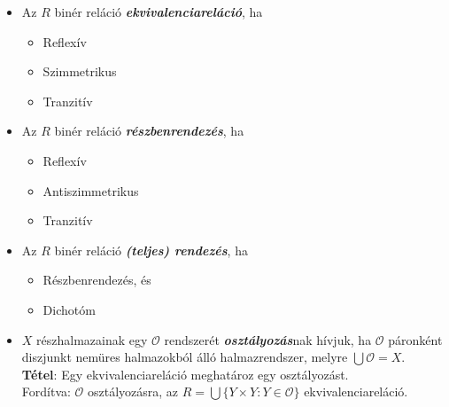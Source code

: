 \documentclass[12pt,margin=0px]{article}
\begin{document}
    \begin{itemize}[leftmargin=5.5mm]
        \renewcommand{\labelitemi}{$\vcenter{\hbox{\tiny$\bullet$}}$}
        \item Az $R$ binér reláció \emph{\textbf{ekvivalenciareláció}}, ha
       	\begin{itemize}
            \renewcommand{\labelitemii}{$\vcenter{\hbox{\tiny$\triangleright$}}$}
        		\item Reflexív
        		\item Szimmetrikus
        		\item Tranzitív
        	\end{itemize}

        \item Az $R$ binér reláció \emph{\textbf{részbenrendezés}}, ha
        \begin{itemize}
            \renewcommand{\labelitemii}{$\vcenter{\hbox{\tiny$\triangleright$}}$}
        	\item Reflexív
        	\item Antiszimmetrikus
        	\item Tranzitív
        \end{itemize}

        \item Az $R$ binér reláció \emph{\textbf{(teljes) rendezés}}, ha
        \begin{itemize}
            \renewcommand{\labelitemii}{$\vcenter{\hbox{\tiny$\triangleright$}}$}
        	\item Részbenrendezés, és
        	\item Dichotóm
        \end{itemize}

        \item $X$ részhalmazainak egy $\mathcal{O}$ rendszerét \emph{\textbf{osztályozás}}nak hívjuk, ha $\mathcal{O}$ páronként diszjunkt nemüres halmazokból álló halmazrendszer, melyre $\bigcup\mathcal{O} = X$.\\

        \textbf{Tétel}: Egy ekvivalenciareláció meghatároz egy osztályozást.\\
        Fordítva: $\mathcal{O}$ osztályozásra, az $R = \bigcup\Big\{Y\times Y : Y \in \mathcal{O} \Big\}$ ekvivalenciareláció.

	\end{itemize}
\end{document}
